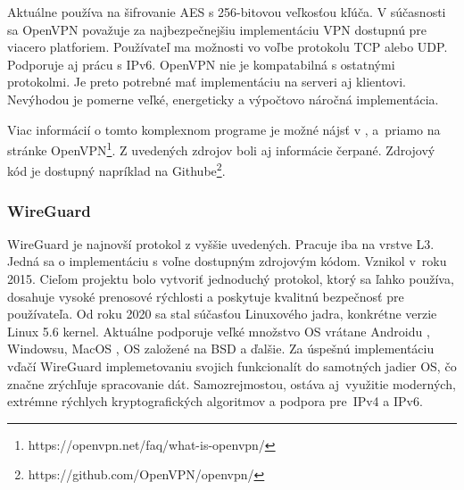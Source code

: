 Aktuálne používa na šifrovanie AES s 256-bitovou veľkosťou kľúča. V súčasnosti sa OpenVPN považuje za najbezpečnejšiu implementáciu VPN dostupnú pre viacero platforiem. Používateľ ma možnosti vo voľbe protokolu TCP alebo UDP. Podporuje aj prácu s IPv6. OpenVPN nie je kompatabilná s ostatnými protokolmi. Je preto potrebné mať implementáciu na serveri aj klientovi. Nevýhodou je pomerne veľké, energeticky a výpočtovo náročná implementácia.

Viac informácií o tomto komplexnom programe je možné nájsť v \cite{vpntech}, \cite{ovpn} a~priamo na stránke OpenVPN\footnote{https://openvpn.net/faq/what-is-openvpn/}. Z uvedených zdrojov boli aj informácie čerpané. Zdrojový kód je dostupný napríklad na Githube\footnote{https://github.com/OpenVPN/openvpn/}. 
\subsubsection{WireGuard}
WireGuard \cite{wireguardpdf} je najnovší protokol z vyššie uvedených. Pracuje iba na vrstve L3. Jedná sa o implementáciu s voľne dostupným zdrojovým kódom. Vznikol v~roku 2015. Cieľom projektu bolo vytvoriť jednoduchý protokol, ktorý sa ľahko používa, dosahuje vysoké prenosové rýchlosti a poskytuje kvalitnú bezpečnosť pre používateľa. Od roku 2020 sa stal súčasťou Linuxového jadra, konkrétne verzie Linux 5.6 kernel. Aktuálne podporuje veľké množstvo OS vrátane Androidu \cite{android}, Windowsu, MacOS \cite{mac}, OS založené na BSD \cite{bsd} a ďalšie. Za úspešnú implementáciu vďačí WireGuard implemetovaniu svojich funkcionalít do samotných jadier OS, čo značne zrýchľuje spracovanie dát. Samozrejmostou, ostáva aj~využitie moderných, extrémne rýchlych kryptografických algoritmov a podpora pre~IPv4 a IPv6. 

